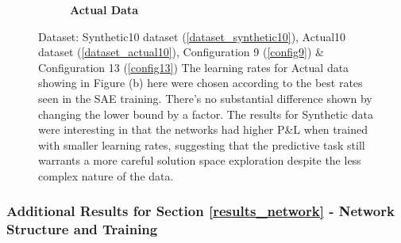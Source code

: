 \documentclass[a4paper,11pt,oneside]{article}
\theoremstyle{plain}
\theoremstyle{definition}
\begin{document}
\begin{figure}[H]
\begin{subfigure}{.5\textwidth}
			\caption{\textbf{Actual Data} 
				\newline }
			\label{figure-actual_pl_minmax_lr}
		\end{subfigure}
		\caption[P\&L by Learning Rates]{Dataset: Synthetic10 dataset (\ref{dataset_synthetic10}), Actual10 dataset (\ref{dataset_actual10}), Configuration 9 (\ref{config9}) \& Configuration 13 (\ref{config13})
			\newline The learning rates for Actual data showing in Figure (b) here were chosen according to the best rates seen in the SAE training. There's no substantial difference shown by changing the lower bound by a factor. The results for Synthetic data were interesting in that the networks had higher P\&L when trained with smaller learning rates, suggesting that the predictive task still warrants a more careful solution space exploration despite the less complex nature of the data.}
		\label{figure-pl_lr}
	\end{figure}
	
	
	
	
	
	
	
	
	
	\subsubsection{Additional Results for Section \ref{results_network} - Network Structure and Training }\label{results_network_appendix}
	
\end{document}
